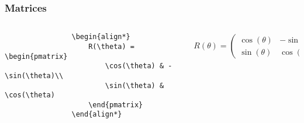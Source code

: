 \copyrightVincent

\begin{frame}[fragile]
    \frametitle{Matrices}
    \begin{columns}
        \begin{column}{0.5\textwidth}
            \begin{verbatim}
                \begin{align*}
                    R(\theta) = \begin{pmatrix}
                        \cos(\theta) & -\sin(\theta)\\
                        \sin(\theta) & \cos(\theta)
                    \end{pmatrix}
                \end{align*}
            \end{verbatim}
        \end{column}
        \begin{column}{0.5\textwidth}
            \begin{align*}
                R(\theta) = \begin{pmatrix}
                    \cos(\theta) & -\sin(\theta)\\
                    \sin(\theta) & \cos(\theta)
                \end{pmatrix}
            \end{align*}
        \end{column}
    \end{columns}
\end{frame}

